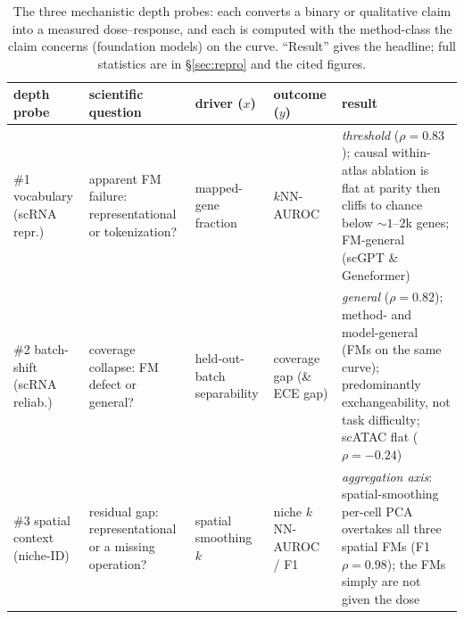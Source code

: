\documentclass[fleqn,10pt,lineno]{wlpeerj}  %
\begin{document}
\begin{table}[!ht]\centering\footnotesize
\caption{The three mechanistic depth probes: each converts a binary or qualitative claim into a measured dose--response, and each is computed with the method-class the claim concerns (foundation models) on the curve. ``Result'' gives the headline; full statistics are in \S\ref{sec:repro} and the cited figures.}\label{tab:probes}
\begin{tabular}{@{}>{\raggedright\arraybackslash}p{1.9cm} >{\raggedright\arraybackslash}p{2.7cm} >{\raggedright\arraybackslash}p{2.0cm} >{\raggedright\arraybackslash}p{1.9cm} >{\raggedright\arraybackslash}p{4.3cm}@{}}
\toprule
depth probe & scientific question & driver ($x$) & outcome ($y$) & result \\
\midrule
\#1 vocabulary (scRNA repr.) & apparent FM failure: representational or tokenization? & mapped-gene fraction & $k$NN-AUROC & \emph{threshold} ($\rho{=}0.83$); causal within-atlas ablation is flat at parity then cliffs to chance below ${\sim}1$--$2$k genes; FM-general (scGPT \& Geneformer) \\[2pt]
\#2 batch-shift (scRNA reliab.) & coverage collapse: FM defect or general? & held-out-batch separability & coverage gap (\& ECE gap) & \emph{general} ($\rho{=}0.82$); method- and model-general (FMs on the same curve); predominantly exchangeability, not task difficulty; scATAC flat ($\rho{=}{-}0.24$) \\[2pt]
\#3 spatial context (niche-ID) & residual gap: representational or a missing operation? & spatial smoothing $k$ & niche $k$NN-AUROC / F1 & \emph{aggregation axis}: spatial-smoothing per-cell PCA overtakes all three spatial FMs (F1 $\rho{=}0.98$); the FMs simply are not given the dose \\
\bottomrule
\end{tabular}
\end{table}
\end{document}
